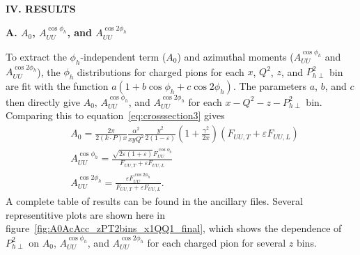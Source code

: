 \documentclass[aps,prl,twocolumn,showpacs,superscriptaddress,groupedaddress]{revtex4-1}  %
\begin{document}

\begin{center}
\textbf{IV. RESULTS} \par
\end{center}
\begin{center}
\textbf{A. $A_0$, $A_{UU}^{\cos\phi_h}$, and $A_{UU}^{\cos 2\phi_h}$} \par
\end{center}
To extract the $\phi_h$-independent term ($A_0$) and azimuthal moments ($A_{UU}^{\cos\phi_h}$ and $A_{UU}^{\cos 2\phi_h}$), the $\phi_h$ distributions for charged pions for each $x$, $Q^2$, $z$, and $P_{h\perp}^2$ bin are fit with the function $a(1 + b\cos\phi_h + c\cos 2\phi_h)$.
The parameters $a$, $b$, and $c$ then directly give $A_0$, $A_{UU}^{\cos\phi_h}$, and $A_{UU}^{\cos 2\phi_h}$ for each $x-Q^2-z-P_{h\perp}^2$ bin.
Comparing this to equation~\ref{eq:crosssection3} gives
\begin{equation}
\label{eq:A0AcAccDefinitions}
\begin{split}
& A_0 = \frac{2\pi}{2(k\cdot P)x} \frac{\alpha^{2}}{xyQ^{2}} \frac{y^{2}}{2 \left( 1 - \varepsilon \right)} \left( 1 + \frac{\gamma^{2}}{2x} \right) \left( F_{UU,T} + \varepsilon F_{UU,L} \right)
\\
& A_{UU}^{\cos \phi_h} = \frac{\sqrt{2 \varepsilon \left( 1 + \varepsilon \right)} F_{UU}^{\cos \phi_h}}{F_{UU,T} + \varepsilon F_{UU,L}}
\\
& A_{UU}^{\cos 2 \phi_h} = \frac{\varepsilon F_{UU}^{\cos 2 \phi_h}}{F_{UU,T} + \varepsilon F_{UU,L}} .
\end{split}
\end{equation}
A complete table of results can be found in the ancillary files.
Several representitive plots are shown here in figure~\ref{fig:A0AcAcc_zPT2bins_x1QQ1_final}, which shows the dependence of $P_{h\perp}^2$ on $A_0$, $A_{UU}^{\cos\phi_h}$, and $A_{UU}^{\cos 2\phi_h}$ for each charged pion for several $z$ bins.
%
\end{document}

